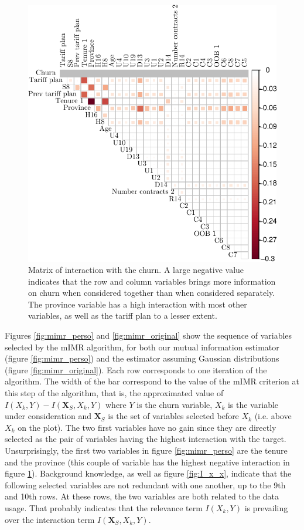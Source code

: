 \begin{figure}
    \centering
    \includegraphics[width=0.8\linewidth]{figures/I_x_x_inter.pdf}
    \caption{Matrix of interaction with the churn. A large negative value
    indicates that the row and column variables brings more information on churn
    when considered together than when considered separately. The  province
    variable has a high interaction with most other variables, as well as the
    tariff plan to a lesser extent.}
    \label{fig:I_x_x_inter}
\end{figure}

Figures \ref{fig:mimr_perso} and \ref{fig:mimr_original} show the sequence of
variables selected by the mIMR algorithm, for both our mutual information
estimator (figure \ref{fig:mimr_perso}) and the estimator assuming Gaussian
distributions (figure \ref{fig:mimr_original}). Each row corresponds to one
iteration of the algorithm. The width of the bar correspond to the value of the
mIMR criterion at this step of the algorithm, that is, the approximated value of
$I(X_k, Y) - I(\bm X_S, X_k, Y)$ where $Y$ is the churn variable, $X_k$ is the
variable under consideration and $\bm X_S$ is the set of variables selected
before $X_k$ (i.e. above $X_k$ on the plot). The two first variables have no
gain since they are directly selected as the pair of variables having the
highest interaction with the target. Unsurprisingly, the first two variables in
figure \ref{fig:mimr_perso} are the tenure and the province (this couple of
variable has the highest negative interaction in figure \ref{fig:I_x_x_inter}).
Background knowledge, as well as figure \ref{fig:I_x_x}, indicate that the
following selected variables are not redundant with one another, up to the 9th
and 10th rows. At these rows, the two variables are both related to the data
usage. That probably indicates that the relevance term $I(X_k, Y)$ is prevailing
over the interaction term $I(\bm X_S, X_k, Y)$.

